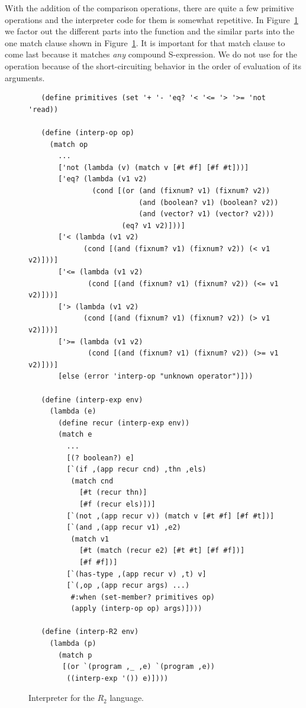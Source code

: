 \documentclass[11pt]{book}
\begin{document}
With the addition of the comparison operations, there are quite a few
primitive operations and the interpreter code for them is somewhat
repetitive. In Figure~\ref{fig:interp-R2} we factor out the different
parts into the  function and the similar parts into
the one match clause shown in Figure~\ref{fig:interp-R2}. It is
important for that match clause to come last because it matches
\emph{any} compound S-expression.  We do not use  for
the  operation because of the short-circuiting behavior in
the order of evaluation of its arguments.


\begin{figure}[tbp]
\begin{lstlisting}
   (define primitives (set '+ '- 'eq? '< '<= '> '>= 'not 'read))

   (define (interp-op op)
     (match op
       ...
       ['not (lambda (v) (match v [#t #f] [#f #t]))]
       ['eq? (lambda (v1 v2)
               (cond [(or (and (fixnum? v1) (fixnum? v2))
                          (and (boolean? v1) (boolean? v2))
                          (and (vector? v1) (vector? v2)))
                      (eq? v1 v2)]))]
       ['< (lambda (v1 v2)
             (cond [(and (fixnum? v1) (fixnum? v2)) (< v1 v2)]))]
       ['<= (lambda (v1 v2)
              (cond [(and (fixnum? v1) (fixnum? v2)) (<= v1 v2)]))]
       ['> (lambda (v1 v2)
             (cond [(and (fixnum? v1) (fixnum? v2)) (> v1 v2)]))]
       ['>= (lambda (v1 v2)
              (cond [(and (fixnum? v1) (fixnum? v2)) (>= v1 v2)]))]
       [else (error 'interp-op "unknown operator")]))

   (define (interp-exp env)
     (lambda (e)
       (define recur (interp-exp env))
       (match e
         ...
         [(? boolean?) e]
         [`(if ,(app recur cnd) ,thn ,els)
          (match cnd
            [#t (recur thn)]
            [#f (recur els)])]
         [`(not ,(app recur v)) (match v [#t #f] [#f #t])]
         [`(and ,(app recur v1) ,e2)
          (match v1
            [#t (match (recur e2) [#t #t] [#f #f])]
            [#f #f])]
         [`(has-type ,(app recur v) ,t) v]
         [`(,op ,(app recur args) ...)
          #:when (set-member? primitives op)
          (apply (interp-op op) args)])))

   (define (interp-R2 env)
     (lambda (p)
       (match p
        [(or `(program ,_ ,e) `(program ,e))
         ((interp-exp '()) e)])))
\end{lstlisting}
\caption{Interpreter for the $R_2$ language.}
\label{fig:interp-R2}
\end{figure}
\end{document}
